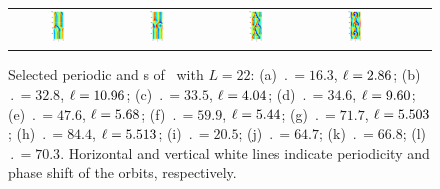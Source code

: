 \begin{figure}[t]
\begin{center}
\begin{tabular}{cccccc}
\includegraphics[width=0.15\textwidth]{figs/ks22rpo059.9-05.44.eps}\hspace{-3ex} &
\includegraphics[width=0.15\textwidth]{figs/ks22rpo084.4-05.51.eps}\hspace{-3ex} &
\includegraphics[width=0.15\textwidth]{figs/ks22rpo064.7-00.00.eps}\hspace{-3ex} &
\includegraphics[width=0.15\textwidth]{figs/ks22rpo070.3-00.00.eps}
\end{tabular}
\end{center}
\caption{Selected periodic and \rpo s of \KSe\ with $L = 22$:
(a) $\period{} = 16.3$, $\ell = 2.86$;
(b) $\period{} = 32.8$, $\ell = 10.96$;
(c) $\period{} = 33.5$, $\ell = 4.04$;
(d) $\period{} = 34.6$, $\ell = 9.60$;
(e) $\period{} = 47.6$, $\ell = 5.68$;
(f) $\period{} = 59.9$, $\ell = 5.44$;
(g) $\period{} = 71.7$, $\ell = 5.503$;
(h) $\period{} = 84.4$, $\ell = 5.513$;
(i) $\period{} = 20.5$;  (j) $\period{} = 64.7$;
(k) $\period{} = 66.8$;  (l) $\period{} = 70.3$.
Horizontal and vertical white lines indicate periodicity and phase
shift of the orbits, respectively.
}\label{f:ks22rpos}
\end{figure}

